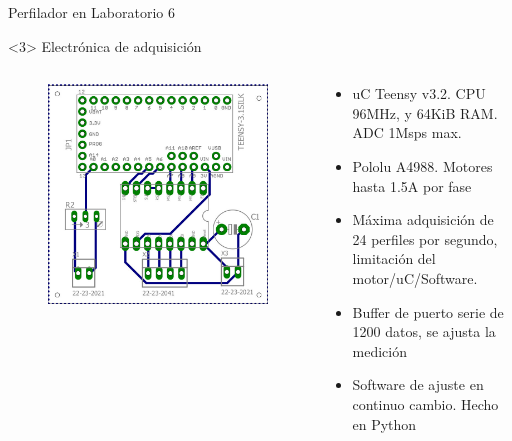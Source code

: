 \begin{frame}{Perfilador en Laboratorio 6}
    \begin{onlyenv}<3>
        Electrónica de adquisición
        \begin{columns}[c]
            \begin{column}{0.3\textwidth}
                \begin{figure}
                    \centering
                    \includegraphics[width=\textwidth]{fig/circuito/circuito_labo6.jpg}
                    \label{fig:circuito}
                \end{figure}
            \end{column}
            \begin{column}{0.6\textwidth}
                \begin{itemize}
                    \item uC Teensy v3.2. CPU 96MHz, y 64KiB RAM. ADC 1Msps max.
                    \item Pololu A4988. Motores hasta 1.5A por fase
                    \item Máxima adquisición de 24 perfiles por segundo, limitación del motor/uC/Software. 
                    \item Buffer de puerto serie de 1200 datos, se ajusta la medición
                    \item Software de ajuste en continuo cambio. Hecho en Python
                \end{itemize}
            \end{column}
        \end{columns}
    \end{onlyenv}
    

\end{frame}
